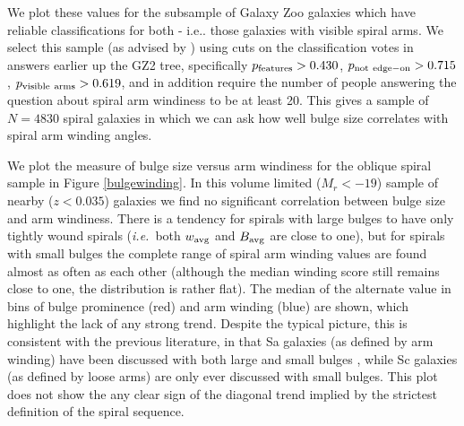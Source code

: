 \documentclass[usenatbib]{mn2e}
\newcommand{\ie}{{\it i.e.}}
\begin{document}
We plot these values for the subsample of Galaxy Zoo galaxies which have reliable classifications for both - i.e.. those galaxies with visible spiral arms. We select this sample (as advised by \citealt{Willett2013}) using cuts on the classification votes in answers earlier up the GZ2 tree, specifically $p_{\rm features} > 0.430$, $p_{\rm not~edge-on} > 0.715$, $p_{\rm visible~arms} > 0.619$, and in addition require the number of people answering the question about spiral arm windiness to be at least 20. This gives a sample of $N = 4830$ spiral galaxies in which we can ask how well bulge size correlates with spiral arm winding angles.
 
 We plot the measure of bulge size versus arm windiness for the oblique spiral sample in Figure \ref{bulgewinding}. In this volume limited ($M_r<-19$) sample of nearby ($z<0.035$) galaxies we find no significant correlation between bulge size and arm windiness. There is a tendency for spirals with large bulges to have only tightly wound spirals (\ie ~both $w_{\rm avg}$ and $B_{\rm avg}$ are close to one), but for spirals with small bulges the complete range of spiral arm winding values are found almost as often as each other (although the median winding score still remains close to one, the distribution is rather flat). The median of the alternate value in bins of bulge prominence (red) and arm winding (blue) are shown, which highlight the lack of any strong trend. Despite the typical picture, this is consistent with the previous literature, in that Sa galaxies (as defined by arm winding) have been discussed with both large and small bulges \citep[e.g.][]{Hogg1993}, while Sc galaxies (as defined by loose arms) are only ever discussed with small bulges. This plot does not show the any clear sign of the diagonal trend implied by the strictest definition of the spiral sequence. 
\end{document}
